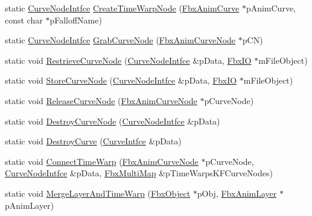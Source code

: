 \begin{DoxyCompactItemize}
\item 
static \hyperlink{class_fbx_anim_utilities_1_1_curve_node_intfce}{Curve\+Node\+Intfce} \hyperlink{class_fbx_anim_utilities_aad2561a0cb51decf1de8d1bdaf5ae288}{Create\+Time\+Warp\+Node} (\hyperlink{class_fbx_anim_curve}{Fbx\+Anim\+Curve} $\ast$p\+Anim\+Curve, const char $\ast$p\+Falloff\+Name)
\item 
static \hyperlink{class_fbx_anim_utilities_1_1_curve_node_intfce}{Curve\+Node\+Intfce} \hyperlink{class_fbx_anim_utilities_ae558341ccc5b80be1cfbf26d14afae03}{Grab\+Curve\+Node} (\hyperlink{class_fbx_anim_curve_node}{Fbx\+Anim\+Curve\+Node} $\ast$p\+CN)
\item 
static void \hyperlink{class_fbx_anim_utilities_a8edba181bc102d45bf3a66ddc987cbac}{Restrieve\+Curve\+Node} (\hyperlink{class_fbx_anim_utilities_1_1_curve_node_intfce}{Curve\+Node\+Intfce} \&p\+Data, \hyperlink{class_fbx_i_o}{Fbx\+IO} $\ast$m\+File\+Object)
\item 
static void \hyperlink{class_fbx_anim_utilities_a85a425cdc6787b10cd6c6f05d23e2b51}{Store\+Curve\+Node} (\hyperlink{class_fbx_anim_utilities_1_1_curve_node_intfce}{Curve\+Node\+Intfce} \&p\+Data, \hyperlink{class_fbx_i_o}{Fbx\+IO} $\ast$m\+File\+Object)
\item 
static void \hyperlink{class_fbx_anim_utilities_a751c0a37e67e7642cd06226894c04f22}{Release\+Curve\+Node} (\hyperlink{class_fbx_anim_curve_node}{Fbx\+Anim\+Curve\+Node} $\ast$p\+Curve\+Node)
\item 
static void \hyperlink{class_fbx_anim_utilities_a0dc57168a97e78aa496f50564b3861ff}{Destroy\+Curve\+Node} (\hyperlink{class_fbx_anim_utilities_1_1_curve_node_intfce}{Curve\+Node\+Intfce} \&p\+Data)
\item 
static void \hyperlink{class_fbx_anim_utilities_ac7f2b9fda23aceec40ed9416f768e207}{Destroy\+Curve} (\hyperlink{class_fbx_anim_utilities_1_1_curve_intfce}{Curve\+Intfce} \&p\+Data)
\item 
static void \hyperlink{class_fbx_anim_utilities_a3e8dfa1d4331e466d3add2c9cc4dd845}{Connect\+Time\+Warp} (\hyperlink{class_fbx_anim_curve_node}{Fbx\+Anim\+Curve\+Node} $\ast$p\+Curve\+Node, \hyperlink{class_fbx_anim_utilities_1_1_curve_node_intfce}{Curve\+Node\+Intfce} \&p\+Data, \hyperlink{class_fbx_multi_map}{Fbx\+Multi\+Map} \&p\+Time\+Warps\+K\+F\+Curve\+Nodes)
\item 
static void \hyperlink{class_fbx_anim_utilities_ac8bbb92723c7bfb8217e4f964a84c94c}{Merge\+Layer\+And\+Time\+Warp} (\hyperlink{class_fbx_object}{Fbx\+Object} $\ast$p\+Obj, \hyperlink{class_fbx_anim_layer}{Fbx\+Anim\+Layer} $\ast$p\+Anim\+Layer)

\end{DoxyCompactItemize}
